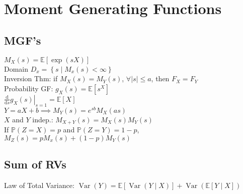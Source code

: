 \section{Moment Generating Functions}
	\subsection*{MGF's}	
	$M_{X}\left(s\right) = \mathbb{E}\left[\exp\left(sX\right)\right]$\\
	Domain $D_{x} = \left\{s\mid M_{x}\left(s\right) < \infty\right\}$\\
	Inversion Thm: if $M_{X}\left(s\right) = M_{Y}\left(s\right)$, $\forall\left|s\right|\leq a$, then $F_{X} = F_{Y}$\\
	Probability GF: $g_{X}\left(s\right) = \mathbb{E}\left[s^{X}\right]$\\
	$\left.\frac{\mathrm{d}}{\mathrm{d}s}g_{X}\left(s\right)\right|_{s=1} = \mathbb{E}\left[X\right]$\\
	$Y = aX + b\implies M_{Y}\left(s\right) = e^{sb}M_{X}\left(as\right)$\\
	$X$ and $Y$ indep.: $M_{X+Y}\left(s\right) = M_{X}\left(s\right)M_{Y}\left(s\right)$\\
	If $\mathbb{P}\left(Z = X\right) = p$ and $\mathbb{P}\left(Z = Y\right) = 1 - p$,\\
	$M_{Z}\left(s\right) = pM_{x}\left(s\right) + \left(1 - p\right)M_{Y}\left(s\right)$
	
	\subsection*{Sum of RVs}
	Law of Total Variance: $\operatorname{Var}\left(Y\right) = \mathbb{E}\left[\operatorname{Var}\left(Y\mid X\right)\right] + \operatorname{Var}\left(\mathbb{E}\left[Y\mid X\right]\right)$
	